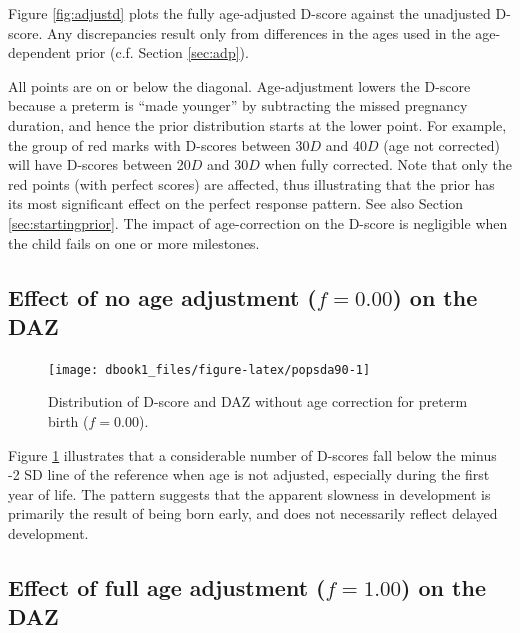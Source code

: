\documentclass[
]{book}
\begin{document}
Figure \ref{fig:adjustd} plots the fully age-adjusted D-score against the unadjusted D-score. Any discrepancies result only from differences in the ages used in the age-dependent prior (c.f. Section \ref{sec:adp}).

All points are on or below the diagonal. Age-adjustment lowers the D-score because a preterm is ``made younger'' by subtracting the missed pregnancy duration, and hence the prior distribution starts at the lower point. For example, the group of red marks with D-scores between 30\(D\) and 40\(D\) (age not corrected) will have D-scores between 20\(D\) and 30\(D\) when fully corrected. Note that only the red points (with perfect scores) are affected, thus illustrating that the prior has its most significant effect on the perfect response pattern. See also Section \ref{sec:startingprior}. The impact of age-correction on the D-score is negligible when the child fails on one or more milestones.

\hypertarget{effect-of-no-age-adjustment-f-0.00-on-the-daz}{%
\subsection{\texorpdfstring{Effect of no age adjustment (\(f = 0.00\)) on the DAZ}{Effect of no age adjustment (f = 0.00) on the DAZ}}\label{effect-of-no-age-adjustment-f-0.00-on-the-daz}}

\begin{figure}

{\centering \texttt{[image: dbook1\_files/figure-latex/popsda90-1]} 

}

\caption{Distribution of D-score and DAZ without age correction for preterm birth (\(f = 0.00\)).}\label{fig:popsda90}
\end{figure}



Figure \ref{fig:popsda90} illustrates that a considerable number of D-scores fall below the minus -2 SD line of the reference when age is not adjusted, especially during the first year of life. The pattern suggests that the apparent slowness in development is primarily the result of being born early, and does not necessarily reflect delayed development.

\hypertarget{effect-of-full-age-adjustment-f-1.00-on-the-daz}{%
\subsection{\texorpdfstring{Effect of full age adjustment (\(f = 1.00\)) on the DAZ}{Effect of full age adjustment (f = 1.00) on the DAZ}}\label{effect-of-full-age-adjustment-f-1.00-on-the-daz}}
\end{document}
